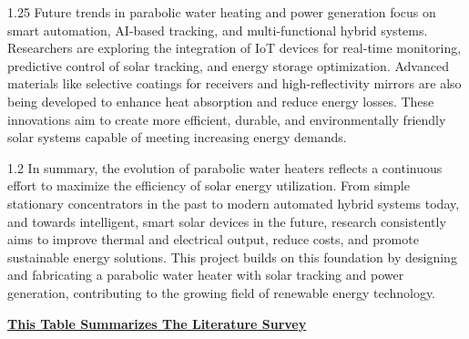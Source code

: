 \documentclass[12pt,a4paper]{article}
\begin{document}
\begin{spacing}{1.25}
{Future trends in parabolic water heating and power generation focus on smart automation, AI-based tracking, and multi-functional hybrid systems. Researchers are exploring the integration of IoT devices for real-time monitoring, predictive control of solar tracking, and energy storage optimization. Advanced materials like selective coatings for receivers and high-reflectivity mirrors are also being developed to enhance heat absorption and reduce energy losses. These innovations aim to create more efficient, durable, and environmentally friendly solar systems capable of meeting increasing energy demands.
}
\end{spacing}
\clearpage




\noindent
\begin{spacing}{1.2}
{\fontsize{10.5}{14.5}\selectfont
In summary, the evolution of parabolic water heaters reflects a continuous effort to maximize the efficiency of solar energy utilization. From simple stationary concentrators in the past to modern automated hybrid systems today, and towards intelligent, smart solar devices in the future, research consistently aims to improve thermal and electrical output, reduce costs, and promote sustainable energy solutions. This project builds on this foundation by designing and fabricating a parabolic water heater with solar tracking and power generation, contributing to the growing field of renewable energy technology.
}
\end{spacing}

\vspace{5mm}
\begin{center}
  {\fontsize{12}{15}\selectfont \bfseries \underline{This Table Summarizes The Literature Survey}}\\[4mm]
\end{center}
\end{document}
